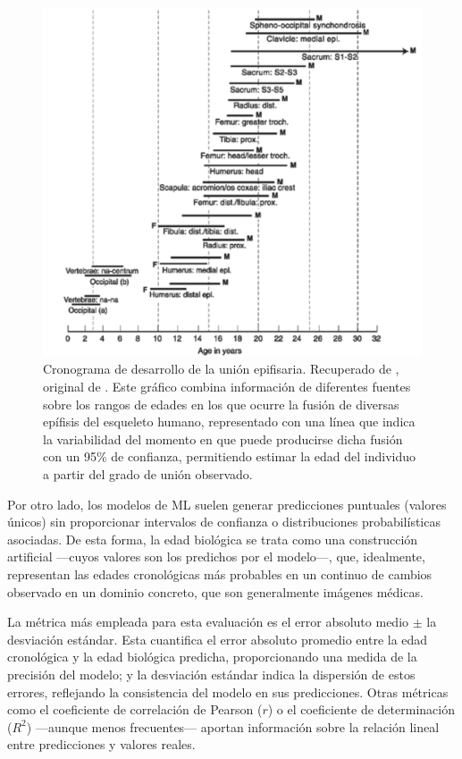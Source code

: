 \begin{figure}[h]
    \centering
    \includegraphics[width=\textwidth]{capitulos/cap_03/imagenes/range_values_epiphyselial.png}
    \caption[
        Cronograma de desarrollo de la unión epifisaria. Recuperado de \cite{byers2023}, original de \cite{buikstra1994}.
    ]{
        Cronograma de desarrollo de la unión epifisaria. Recuperado de \cite{byers2023}, original de \cite{buikstra1994}. 
        Este gráfico combina información de diferentes fuentes sobre los rangos de edades en los que ocurre la fusión de diversas epífisis del esqueleto humano, representado con una línea que indica la variabilidad del momento en que puede producirse dicha fusión con un 95\% de confianza, permitiendo estimar la edad del individuo a partir del grado de unión observado.
    }
    \label{fig:range_values_epiphyselial}
\end{figure}

Por otro lado, los modelos de ML suelen generar predicciones puntuales (valores únicos) sin proporcionar intervalos de confianza o distribuciones probabilísticas asociadas. De esta forma, la edad biológica se trata como una construcción artificial ---cuyos valores son los predichos por el modelo---, que, idealmente, representan las edades cronológicas más probables en un continuo de cambios observado en un dominio concreto, que son generalmente imágenes médicas. 

La métrica más empleada para esta evaluación es el error absoluto medio $\pm$ la desviación estándar. Esta cuantifica el error absoluto promedio entre la edad cronológica y la edad biológica predicha, proporcionando una medida de la precisión del modelo; y la desviación estándar indica la dispersión de estos errores, reflejando la consistencia del modelo en sus predicciones. Otras métricas como el coeficiente de correlación de Pearson ($r$) o el coeficiente de determinación ($R^2$) ---aunque menos frecuentes--- aportan información sobre la relación lineal entre predicciones y valores reales.

